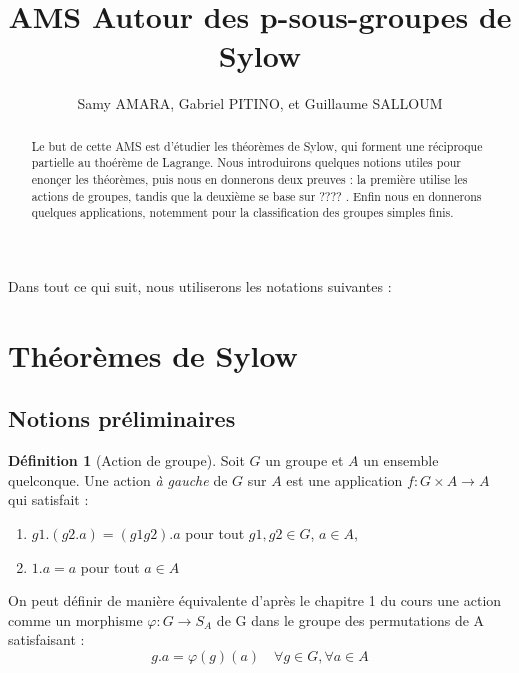 \documentclass[french]{article}
\title{AMS Autour des p-sous-groupes de Sylow}
\author{Samy AMARA, Gabriel PITINO, et Guillaume SALLOUM}
\date{}
\theoremstyle{definition}
\newtheorem{definition}[subsubsection]{Définition}
\theoremstyle{plain}
\theoremstyle{plain}
\theoremstyle{plain}
\theoremstyle{plain}
\theoremstyle{plain}
\begin{document}
\maketitle
\begin{abstract}
	Le but de cette AMS est d'étudier les théorèmes de Sylow, qui forment une réciproque partielle au thoérème de Lagrange.
	Nous introduirons quelques notions utiles pour enonçer les théorèmes, puis nous en donnerons deux preuves : la première utilise les actions de groupes, tandis que la deuxième se base sur ????  .
	Enfin nous en donnerons quelques applications, notemment pour la classification des groupes simples finis.%
\end{abstract}



\tableofcontents
\clearpage

Dans tout ce qui suit, nous utiliserons les notations suivantes :
\glsaddall
\printglossary[title=Notations,type=symbols,style=long,nonumberlist]

\clearpage


\section{Théorèmes de Sylow}
\subsection{Notions préliminaires}


\begin{definition}[Action de groupe]
	Soit \( G \) un groupe et \( A \) un ensemble quelconque. Une action \textit{à gauche} de \( G \) sur \( A \) est une application \( f : G \times A \rightarrow A\) qui satisfait :
	\begin{enumerate}[label = (\roman*)]
		\item \(g1.(g2.a) = (g1g2).a \) pour tout \(g1,g2 \in G\), \(a \in A\),
		\item \(1.a = a\) pour tout \(a \in A\)
	\end{enumerate}

	On peut définir de manière équivalente d'après le chapitre 1 du cours une action comme un morphisme \( \varphi : G \rightarrow S_{A} \) de G dans le groupe des permutations de A satisfaisant :
	\begin{equation}
		g.a = \varphi(g)(a) \quad \forall g \in G, \forall a \in A
	\end{equation}
\end{definition}
\end{document}
